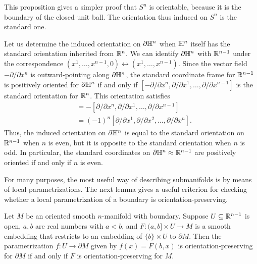 \begin{example}
This proposition gives a simpler proof that $S^n$ is orientable, because it is the boundary of the closed unit ball. The orientation thus induced on $S^n$ is the standard one.
\end{example}
\begin{example}\label{orientation induce H^n}
Let us determine the induced orientation on $\partial\mathbb{H}^n$ when $\mathbb{H}^n$ itself has the standard orientation inherited from $\mathbb{R}^n$. We can identify $\partial\mathbb{H}^n$ with $\mathbb{R}^{n-1}$ under the correspondence $(x^1,\dots,x^{n-1},0)\leftrightarrow(x^1,\dots,x^{n-1})$. Since the vector field $-\partial/\partial x^n$ is outward-pointing along $\partial\mathbb{H}^n$, the standard coordinate frame for $\mathbb{R}^{n-1}$ is positively oriented for $\partial\mathbb{H}^n$ if and only if $[-\partial/\partial x^n,\partial/\partial x^1,\dots,\partial/\partial x^{n-1}]$ is the standard orientation for $\mathbb{R}^n$. This orientation satisfies
\begin{align*}
[-\partial/\partial x^n,\partial/\partial x^1,\dots,\partial/\partial x^{n-1}]&=-[\partial/\partial x^n,\partial/\partial x^1,\dots,\partial/\partial x^{n-1}]\\
&=(-1)^n[\partial/\partial x^1,\partial/\partial x^2,\dots,\partial/\partial x^{n}].
\end{align*}
Thus, the induced orientation on $\partial\mathbb{H}^n$ is equal to the standard orientation on $\mathbb{R}^{n-1}$ when $n$ is even, but it is opposite to the standard orientation when $n$ is odd. In particular, the standard coordinates on $\partial\mathbb{H}^n\approx\mathbb{R}^{n-1}$ are positively oriented if and only if $n$ is even.
\end{example}
For many purposes, the most useful way of describing submanifolds is by means
of local parametrizations. The next lemma gives a useful criterion for checking
whether a local parametrization of a boundary is orientation-preserving.
\begin{lemma}\label{orientation preserve lem}
Let $M$ be an oriented smooth $n$-manifold with boundary. Suppose $U\subseteq\mathbb{R}^{n-1}$ is open, $a,b$ are real numbers with $a<b$, and $F:(a,b]\times U\to M$ is a smooth embedding that restricts to an embedding of $\{b\}\times U$ to $\partial M$. Then the parametrization $f:U\to\partial M$ given by $f(x)=F(b,x)$ is orientation-preserving
for $\partial M$ if and only if $F$ is orientation-preserving for $M$.
\end{lemma}
